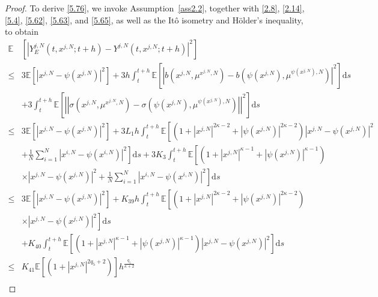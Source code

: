 \documentclass[12pt]{article}
\numberwithin{equation}{section}
\begin{document}
\begin{proof}
To derive \eqref{5.76}, we invoke Assumption~\ref{ass2.2}, together with  \eqref{2.8}, \eqref{2.14}, \eqref{5.4}, \eqref{5.62}, \eqref{5.63}, and \eqref{5.65}, as well as the It\^o isometry and H\"older's inequality, to obtain
\begin{equation}\tag{5.106}\label{5.80}
\begin{aligned}
  \mathbb{E}&\left[\left|Y^{j,N}_E\left(t, x^{j,N} ; t+h\right)-Y^{j,N}\left(t, x^{j,N} ; t+h\right)\right|^{2}\right] \\
\leq & 3 \mathbb{E}\left[\left|x^{j,N}-\psi\left(x^{j,N}\right)\right|^{2}\right]+3 h\int_t^{t+h} \mathbb{E}\left[\left|b\left( x^{j,N},\mu ^{x^{j,N},N} \right)-b\left( \psi\left(x^{j,N}\right),\mu ^{\psi\left(x^{j,N}\right),N} \right)\right|^{2}\right] \mathrm{d} s\\
&+3\int_t^{t+h}\mathbb{E}\left[\left|\left| \sigma\left( x^{j,N},\mu ^{x^{j,N},N} \right)-\sigma\left( \psi\left(x^{j,N}\right),\mu ^{\psi\left(x^{j,N}\right),N} \right)\right|\right|^{2}\right] \mathrm{d}s  \\
\leq &3\mathbb{E}\left[\left|x^{j,N}-\psi\left(x^{j,N}\right)\right|^{2}\right]+3L_{1}h \int_t^{t+h} \mathbb{E}\left[ \left( 1+\left|x^{j,N}\right|^{2\kappa -2}+\left|\psi\left(x^{j,N}\right)\right|^{2\kappa -2} \right) \left|x^{j,N}-\psi\left(x^{j,N}\right)\right|^2\right.\\
&+\left.\tfrac{1}{N}\sum_{i=1}^N{\left|x^{i,N}-\psi\left(x^{i,N}\right)\right|^2}\right] \mathrm{d} s+3K_{3} \int_t^{t+h} \mathbb{E}\left[ \left( 1+\left|x^{j,N}\right|^{\kappa -1}+\left|\psi\left(x^{j,N}\right)\right|^{\kappa -1} \right) \right.\\
&\times\left.\left|x^{j,N}-\psi\left(x^{j,N}\right)\right|^2+\tfrac{1}{N}\sum_{i=1}^N{\left|x^{i,N}-\psi\left(x^{i,N}\right)\right|^2} \right] \mathrm{d} s\\
\leq &3\mathbb{E}\left[\left|x^{j,N}-\psi\left(x^{j,N}\right)\right|^{2}\right]+{K_{39}}h \int_t^{t+h} \mathbb{E}\left[ \left( 1+\left|x^{j,N}\right|^{2\kappa -2}+\left|\psi\left(x^{j,N}\right)\right|^{2\kappa -2} \right)\right.\\
&\times\left.\left|x^{j,N}-\psi\left(x^{j,N}\right)\right|^2\right] \mathrm{d} s\\
&+{K_{40}} \int_t^{t+h} \mathbb{E}\left[ \left( 1+\left|x^{j,N}\right|^{\kappa -1}+\left|\psi\left(x^{j,N}\right)\right|^{\kappa -1} \right) \left|x^{j,N}-\psi\left(x^{j,N}\right)\right|^2\right] \mathrm{d} s\\
\leq & K_{41}\mathbb{E}\left[\left(1+\left|x^{j,N}\right|^{2q_{5}+2}\right)\right]h^{\frac{q_5}{\kappa+2}}\\

\end{aligned}
\end{equation}
\end{proof}
\end{document}
